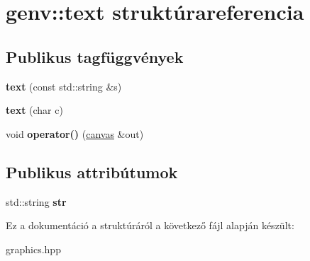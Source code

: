 \hypertarget{structgenv_1_1text}{}\section{genv\+:\+:text struktúrareferencia}
\label{structgenv_1_1text}
\subsection*{Publikus tagfüggvények}
\begin{DoxyCompactItemize}
\item 
\mbox{\label{structgenv_1_1text_ae187a9809090986ac3a852df95dab0e9}} 
{\bfseries text} (const std\+::string \&s)
\item 
\mbox{\label{structgenv_1_1text_a6c076c54816998e68c70c246f230303c}} 
{\bfseries text} (char c)
\item 
\mbox{\label{structgenv_1_1text_ae878f27480e2b3cebc61268268477b95}} 
void {\bfseries operator()} (\hyperlink{classgenv_1_1canvas}{canvas} \&out)
\end{DoxyCompactItemize}
\subsection*{Publikus attribútumok}
\begin{DoxyCompactItemize}
\item 
\mbox{\label{structgenv_1_1text_ae27ed3ed9815c3990cc92109f3861046}} 
std\+::string {\bfseries str}
\end{DoxyCompactItemize}


Ez a dokumentáció a struktúráról a következő fájl alapján készült\+:\begin{DoxyCompactItemize}
\item 
graphics.\+hpp\end{DoxyCompactItemize}
